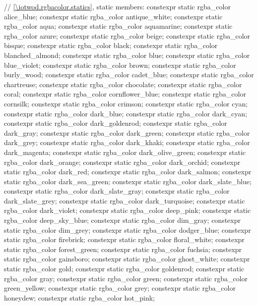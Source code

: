 \begin{codeblock}
{{    // \ref{\iotwod.rgbacolor.statics}, static members:
    constexpr static rgba_color alice_blue;
    constexpr static rgba_color antique_white;
    constexpr static rgba_color aqua;
    constexpr static rgba_color aquamarine;
    constexpr static rgba_color azure;
    constexpr static rgba_color beige;
    constexpr static rgba_color bisque;
    constexpr static rgba_color black;
    constexpr static rgba_color blanched_almond;
    constexpr static rgba_color blue;
    constexpr static rgba_color blue_violet;
    constexpr static rgba_color brown;
    constexpr static rgba_color burly_wood;
    constexpr static rgba_color cadet_blue;
    constexpr static rgba_color chartreuse;
    constexpr static rgba_color chocolate;
    constexpr static rgba_color coral;
    constexpr static rgba_color cornflower_blue;
    constexpr static rgba_color cornsilk;
    constexpr static rgba_color crimson;
    constexpr static rgba_color cyan;
    constexpr static rgba_color dark_blue;
    constexpr static rgba_color dark_cyan;
    constexpr static rgba_color dark_goldenrod;
    constexpr static rgba_color dark_gray;
    constexpr static rgba_color dark_green;
    constexpr static rgba_color dark_grey;
    constexpr static rgba_color dark_khaki;
    constexpr static rgba_color dark_magenta;
    constexpr static rgba_color dark_olive_green;
    constexpr static rgba_color dark_orange;
    constexpr static rgba_color dark_orchid;
    constexpr static rgba_color dark_red;
    constexpr static rgba_color dark_salmon;
    constexpr static rgba_color dark_sea_green;
    constexpr static rgba_color dark_slate_blue;
    constexpr static rgba_color dark_slate_gray;
    constexpr static rgba_color dark_slate_grey;
    constexpr static rgba_color dark_turquoise;
    constexpr static rgba_color dark_violet;
    constexpr static rgba_color deep_pink;
    constexpr static rgba_color deep_sky_blue;
    constexpr static rgba_color dim_gray;
    constexpr static rgba_color dim_grey;
    constexpr static rgba_color dodger_blue;
    constexpr static rgba_color firebrick;
    constexpr static rgba_color floral_white;
    constexpr static rgba_color forest_green;
    constexpr static rgba_color fuchsia;
    constexpr static rgba_color gainsboro;
    constexpr static rgba_color ghost_white;
    constexpr static rgba_color gold;
    constexpr static rgba_color goldenrod;
    constexpr static rgba_color gray;
    constexpr static rgba_color green;
    constexpr static rgba_color green_yellow;
    constexpr static rgba_color grey;
    constexpr static rgba_color honeydew;
    constexpr static rgba_color hot_pink;
}}
\end{codeblock}
